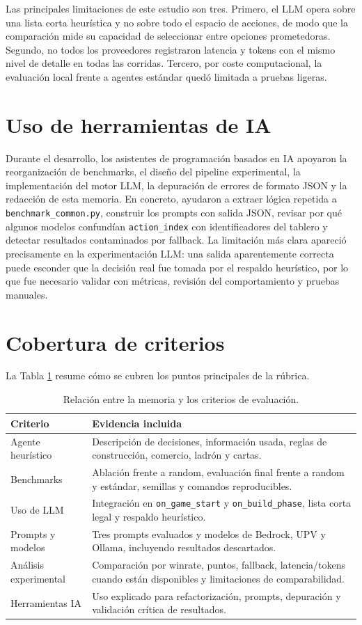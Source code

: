 ﻿\documentclass[10pt,a4paper]{article}
\begin{document}
Las principales limitaciones de este estudio son tres. Primero, el LLM opera sobre una lista corta heurística y no sobre todo el espacio de acciones, de modo que la comparación mide su capacidad de seleccionar entre opciones prometedoras. Segundo, no todos los proveedores registraron latencia y tokens con el mismo nivel de detalle en todas las corridas. Tercero, por coste computacional, la evaluación local frente a agentes estándar quedó limitada a pruebas ligeras.

\section{Uso de herramientas de IA}
Durante el desarrollo, los asistentes de programación basados en IA apoyaron la reorganización de benchmarks, el diseño del pipeline experimental, la implementación del motor LLM, la depuración de errores de formato JSON y la redacción de esta memoria. En concreto, ayudaron a extraer lógica repetida a \texttt{benchmark\_common.py}, construir los prompts con salida JSON, revisar por qué algunos modelos confundían \texttt{action\_index} con identificadores del tablero y detectar resultados contaminados por fallback. La limitación más clara apareció precisamente en la experimentación LLM: una salida aparentemente correcta puede esconder que la decisión real fue tomada por el respaldo heurístico, por lo que fue necesario validar con métricas, revisión del comportamiento y pruebas manuales.

\section{Cobertura de criterios}
La Tabla \ref{tab:criterios} resume cómo se cubren los puntos principales de la rúbrica.

\begin{table}[H]
\centering
\scriptsize
\begin{tabular}{p{4.0cm}p{10.0cm}}
\toprule
Criterio & Evidencia incluida \\
\midrule
Agente heurístico & Descripción de decisiones, información usada, reglas de construcción, comercio, ladrón y cartas. \\
Benchmarks & Ablación frente a random, evaluación final frente a random y estándar, semillas y comandos reproducibles. \\
Uso de LLM & Integración en \texttt{on\_game\_start} y \texttt{on\_build\_phase}, lista corta legal y respaldo heurístico. \\
Prompts y modelos & Tres prompts evaluados y modelos de Bedrock, UPV y Ollama, incluyendo resultados descartados. \\
Análisis experimental & Comparación por winrate, puntos, fallback, latencia/tokens cuando están disponibles y limitaciones de comparabilidad. \\
Herramientas IA & Uso explicado para refactorización, prompts, depuración y validación crítica de resultados. \\
\bottomrule
\end{tabular}
\caption{Relación entre la memoria y los criterios de evaluación.}
\label{tab:criterios}
\end{table}
\end{document}
